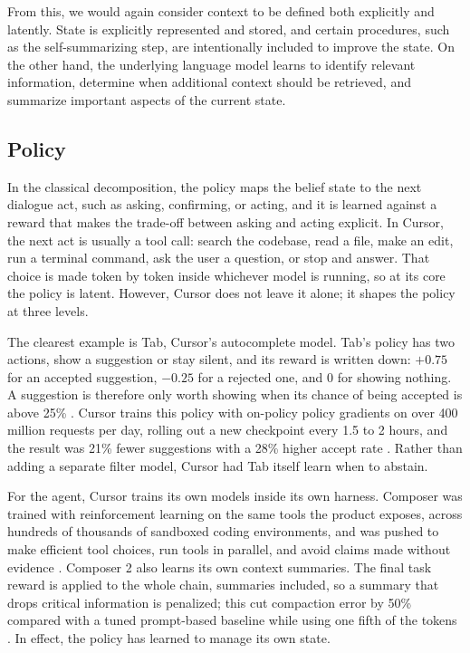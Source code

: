 \documentclass[11pt]{article}
\begin{document}
From this, we would again consider context to be defined both explicitly and latently. State is explicitly represented and stored, and certain procedures, such as the self-summarizing step, are intentionally included to improve the state. On the other hand, the underlying language model learns to identify relevant information, determine when additional context should be retrieved, and summarize important aspects of the current state.


\subsection{Policy}

In the classical decomposition, the policy maps the belief state to the next dialogue act, such as asking, confirming, or acting, and it is learned against a reward that makes the trade-off between asking and acting explicit. In Cursor, the next act is usually a tool call: search the codebase, read a file, make an edit, run a terminal command, ask the user a question, or stop and answer. That choice is made token by token inside whichever model is running, so at its core the policy is latent. However, Cursor does not leave it alone; it shapes the policy at three levels.

The clearest example is Tab, Cursor's autocomplete model. Tab's policy has two actions, show a suggestion or stay silent, and its reward is written down: $+0.75$ for an accepted suggestion, $-0.25$ for a rejected one, and $0$ for showing nothing. A suggestion is therefore only worth showing when its chance of being accepted is above 25\% \citep{jackson2025tabrl}. Cursor trains this policy with on-policy policy gradients on over 400 million requests per day, rolling out a new checkpoint every 1.5 to 2 hours, and the result was 21\% fewer suggestions with a 28\% higher accept rate \citep{jackson2025tabrl}. Rather than adding a separate filter model, Cursor had Tab itself learn when to abstain.

For the agent, Cursor trains its own models inside its own harness. Composer was trained with reinforcement learning on the same tools the product exposes, across hundreds of thousands of sandboxed coding environments, and was pushed to make efficient tool choices, run tools in parallel, and avoid claims made without evidence \citep{cursor2025composer}. Composer 2 also learns its own context summaries. The final task reward is applied to the whole chain, summaries included, so a summary that drops critical information is penalized; this cut compaction error by 50\% compared with a tuned prompt-based baseline while using one fifth of the tokens \citep{cassano2026composer}. In effect, the policy has learned to manage its own state.
\end{document}
